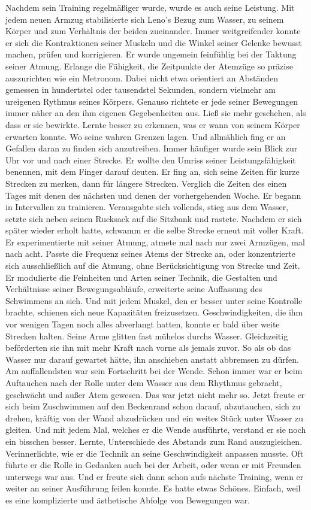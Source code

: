 \documentclass[ngerman,smalldemyvopaper,11pt,oneside,onecolumn,openright,extrafontsizes]{memoir}
\begin{document}
Nachdem sein Training regelmäßiger wurde, wurde es auch seine Leistung. Mit jedem neuen Armzug stabilisierte sich Leno's Bezug zum Wasser, zu seinem Körper und zum Verhältnis der beiden zueinander. Immer weitgreifender konnte er sich die Kontraktionen seiner Muskeln und die Winkel seiner Gelenke bewusst machen, prüfen und korrigieren. Er wurde ungemein feinfühlig bei der Taktung seiner Atmung. Erlange die Fähigkeit, die Zeitpunkte der Atemzüge so präzise auszurichten wie ein Metronom. Dabei nicht etwa orientiert an Abständen gemessen in hundertstel oder tausendstel Sekunden, sondern vielmehr am ureigenen Rythmus seines Körpers. Genauso richtete er jede seiner Bewegungen immer näher an den ihm eigenen Gegebenheiten aus. Ließ sie mehr geschehen, als dass er sie bewirkte. Lernte besser zu erkennen, was er wann von seinem Körper erwarten konnte. Wo seine wahren Grenzen lagen. Und allmählich fing er an Gefallen daran zu finden sich anzutreiben. Immer häufiger wurde sein Blick zur Uhr vor und nach einer Strecke. Er wollte den Umriss seiner Leistungsfähigkeit benennen, mit dem Finger darauf deuten. Er fing an, sich seine Zeiten für kurze Strecken zu merken, dann für längere Strecken. Verglich die Zeiten des einen Tages mit denen des nächsten und denen der vorhergehenden Woche. Er begann in Intervallen zu trainieren. Verausgabte sich vollends, stieg aus dem Wasser, setzte sich neben seinen Rucksack auf die Sitzbank und rastete. Nachdem er sich später wieder erholt hatte, schwamm er die selbe Strecke erneut mit voller Kraft. Er experimentierte mit seiner Atmung, atmete mal nach nur zwei Armzügen, mal nach acht. Passte die Frequenz seines Atems der Strecke an, oder konzentrierte sich ausschließlich auf die Atmung, ohne Berücksichtigung von Strecke und Zeit. Er modulierte die Feinheiten und Arten seiner Technik, die Gestalten und Verhältnisse seiner Bewegungsabläufe, erweiterte seine Auffassung des Schwimmens an sich. Und mit jedem Muskel, den er besser unter seine Kontrolle brachte, schienen sich neue Kapazitäten freizusetzen. Geschwindigkeiten, die ihm vor wenigen Tagen noch alles abverlangt hatten, konnte er bald über weite Strecken halten. Seine Arme glitten fast mühelos durchs Wasser. Gleichzeitig beförderten sie ihn mit mehr Kraft nach vorne als jemals zuvor. So als ob das Wasser nur darauf gewartet hätte, ihn anschieben anstatt abbremsen zu dürfen. Am auffallendsten war sein Fortschritt bei der Wende. Schon immer war er beim Auftauchen nach der Rolle unter dem Wasser aus dem Rhythmus gebracht, geschwächt und außer Atem gewesen. Das war jetzt nicht mehr so. Jetzt freute er sich beim Zuschwimmen auf den Beckenrand schon darauf, abzutauchen, sich zu drehen, kräftig von der Wand abzudrücken und ein weites Stück unter Wasser zu gleiten. Und mit jedem Mal, welches er die Wende ausführte, verstand er sie noch ein bisschen besser. Lernte, Unterschiede des Abstands zum Rand auszugleichen. Verinnerlichte, wie er die Technik an seine Geschwindigkeit anpassen musste. Oft führte er die Rolle in Gedanken auch bei der Arbeit, oder wenn er mit Freunden unterwegs war aus. Und er freute sich dann schon aufs nächste Training, wenn er weiter an seiner Ausführung feilen konnte. Es hatte etwas Schönes. Einfach, weil es eine komplizierte und ästhetische Abfolge von Bewegungen war.\\
\end{document}
